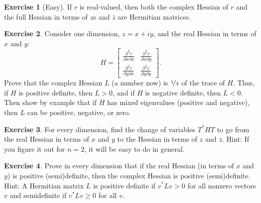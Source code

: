 \documentclass[12pt,openany]{book}
\theoremstyle{plain}
\theoremstyle{remark}
\theoremstyle{definition}
\newenvironment{exbox}{%
    \def\FrameCommand{\vrule width 1pt \relax\hspace{10pt}}%
    \MakeFramed{\advance\hsize-\width\FrameRestore}%
}{%
    \endMakeFramed
}
\theoremstyle{exercise}
\newtheorem{exercise}{Exercise}[section]
\theoremstyle{example}
\begin{document}
\begin{exbox}
\begin{exercise}[Easy]
If $r$ is real-valued, then both the complex Hessian of $r$
and the full Hessian in terms of $z$s and $\bar{z}$
are Hermitian matrices.
\end{exercise}

\begin{exercise}
\pagebreak[2]
Consider one dimension, $z = x+iy$, and the real Hessian
in terms of $x$ and $y$:
\begin{equation*}
H=\begin{bmatrix}
\frac{\partial^2 r}{\partial x\partial x} &
\frac{\partial^2 r}{\partial x \partial y}
\\[4pt]
\frac{\partial^2 r}{\partial y \partial x} &
\frac{\partial^2 r}{\partial y\partial y}
\end{bmatrix} .
\end{equation*}
Prove that the complex Hessian $L$ (a number now) is $\nicefrac{1}{4}$
of the trace of $H$.
Thus, if $H$ is positive definite, then $L > 0$, and if $H$ is negative
definite, then $L < 0$.  Then show by example that
if $H$ has mixed eigenvalues (positive
and negative), then $L$ can be positive, negative, or zero.
\end{exercise}

\begin{exercise}
\pagebreak[2]
For every dimension,
find the change of variables $T^* H T$ to go from the real Hessian in terms
of $x$ and $y$ to the Hessian in terms of $z$ and $\bar{z}$.
Hint: If you figure it out for $n=2$, it
will be easy to do in general.
\end{exercise}

\begin{exercise}
Prove in every dimension that if the real Hessian (in terms of $x$ and $y$) is
positive (semi)definite, then the complex Hessian is positive (semi)definite.
Hint: A Hermitian matrix $L$ is positive definite if $v^*Lv > 0$ for all
nonzero vectors $v$ and semidefinite if $v^*Lv \geq 0$ for all $v$.
\end{exercise}
\end{exbox}
\end{document}
